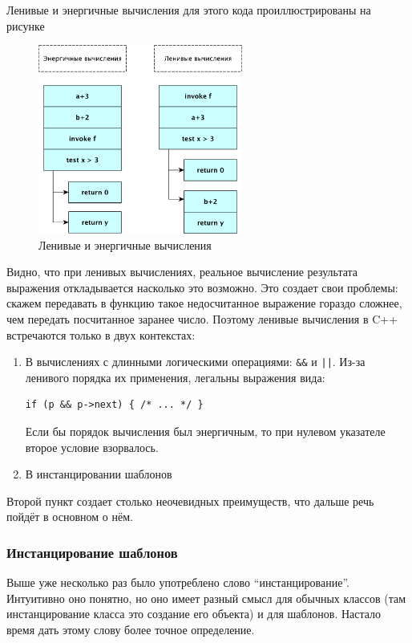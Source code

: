 \documentclass[a4paper,12pt,oneside]{article}
\begin{document}
Ленивые и энергичные вычисления для этого кода проиллюстрированы на рисунке

\begin{figure}[h!]
\centering
\includegraphics[width=0.6\textwidth]{illustrations/lazyorder-crop.pdf}
\caption{Ленивые и энергичные вычисления}
\label{fig:lazy_calc}
\end{figure}

Видно, что при ленивых вычислениях, реальное вычисление результата выражения откладывается насколько это возможно. Это создает свои проблемы: скажем передавать в функцию такое недосчитанное выражение гораздо сложнее, чем передать посчитанное заранее число. Поэтому ленивые вычисления в C++ встречаются только в двух контекстах:

\begin{enumerate}
\item В вычислениях с длинными логическими операциями: \lstinline!&&! и \lstinline!||!. Из-за ленивого порядка их применения, легальны выражения вида:
\begin{lstlisting}
if (p && p->next) { /* ... */ }
\end{lstlisting}
Если бы порядок вычисления был энергичным, то при нулевом указателе второе условие взорвалось.
\item В инстанцировании шаблонов
\end{enumerate}

Второй пункт создает столько неочевидных преимуществ, что дальше речь пойдёт в основном о нём.

\subsubsection{Инстанцирование шаблонов}\label{Templateinstancing}

Выше уже несколько раз было употреблено слово ``инстанцирование''. Интуитивно оно понятно, но оно имеет разный смысл для обычных классов (там инстанцирование класса это создание его объекта) и для шаблонов. Настало время дать этому слову более точное определение.
\end{document}

